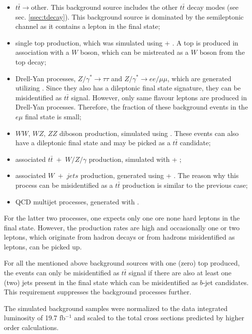 \begin{itemize}
 \item $t\bar{t}\rightarrow$other. This background source includes the other $t\bar{t}$ decay modes (see sec. \ref{ssec:tdecay}).
 This background source is dominated by the semileptonic channel as it contains a lepton in the final state;
 \item single top production, which was simulated using \Powheg + \PYTHIA. A top is produced in association with a $W$ boson, which can be 
 mistreated as a $W$ boson from the top decay;
 \item Drell-Yan processes, $Z/\gamma^{*} \rightarrow \tau\tau$ and $Z/\gamma^{*} \rightarrow ee/\mu\mu$, which are generated utilizing \PYTHIA. 
 Since they also has a dileptonic final state signature, they can be misidentified as $t\bar{t}$ signal. However, only same flavour leptons 
 are produced in Drell-Yan processes. Therefore, the fraction of these
 background events in the $e\mu$ final state is small;
 \item $WW$, $WZ$, $ZZ$ diboson production, simulated using \PYTHIA. These events can also have a dileptonic final state and may be 
 picked as a $t\bar{t}$ candidate;
 \item associated $t\bar{t}\;+\; W/Z/\gamma$ production, simulated with \MG + \PYTHIA;
 \item associated $W\;+\;jets$ production, generated using \MG + \PYTHIA. The reason why this process can be misidentified as a $t\bar{t}$
 production is similar to the previous case;
 \item QCD multijet processes, generated with \PYTHIA.
\end{itemize}
For the latter two processes, one expects only one ore none hard leptons in the final state. However, the production rates are high and 
occasionally one or two leptons, which originate from hadron decays or from hadrons misidentified as leptons, can be picked up.

For all the mentioned above background sources with one (zero) top produced, the events can only be misidentified as $t\bar{t}$ signal
if there are also at least one (two) jets present in the final state which can be misidentified as $b$-jet candidates. This requirement
suppresses the background processes further.

The simulated background samples were normalized to the data integrated luminosity of 19.7 fb$^{-1}$ and
scaled to the total cross sections predicted by higher order calculations\cite{TWikiXSec}.

